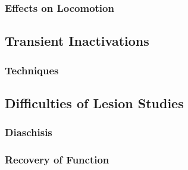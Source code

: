 \subsubsection{Effects on Locomotion}

\subsection{Transient Inactivations}

\subsubsection{Techniques}

\subsection{Difficulties of Lesion Studies}

\subsubsection{Diaschisis}

\subsubsection{Recovery of Function}
